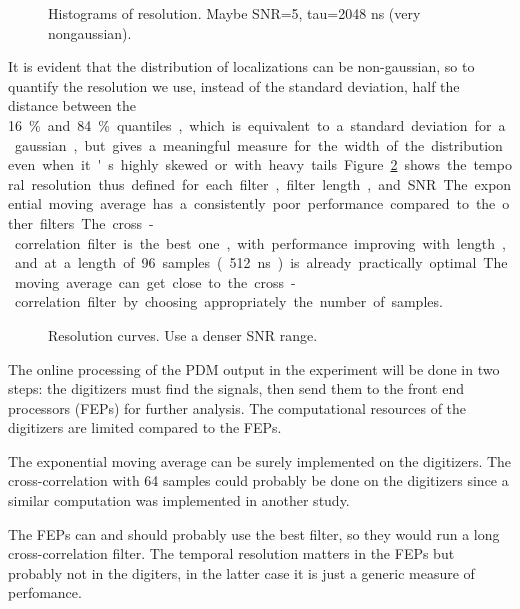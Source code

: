 \begin{figure}
    Histograms of resolution. Maybe SNR=5, tau=2048 ns (very nongaussian).
    \caption{}
    \label{fig:lochist}
\end{figure}

It is evident that the distribution of localizations can be non-gaussian, so to
quantify the resolution we use, instead of the standard deviation, half the
distance between the \SI{16}\% and \SI{84}\% quantiles, which is equivalent to
a standard deviation for a gaussian, but gives a meaningful measure for the
width of the distribution even when it's highly skewed or with heavy tails.

Figure~\ref{fig:rescurve} shows the temporal resolution thus defined for each
filter, filter length, and SNR. The exponential moving average has a
consistently poor performance compared to the other filters. The
cross-correlation filter is the best one, with performance improving with
length, and at a length of 96 samples (\SI{512}{ns}) is already practically
optimal. The moving average can get close to the cross-correlation filter by
choosing appropriately the number of samples.

\begin{figure}
    Resolution curves. Use a denser SNR range.
    \caption{}
    \label{fig:rescurve}
\end{figure}

The online processing of the PDM output in the experiment will be done in two
steps: the digitizers must find the signals, then send them to the front end
processors (FEPs) for further analysis. The computational resources of the
digitizers are limited compared to the FEPs.

The exponential moving average can be surely implemented on the digitizers. The
cross-correlation with 64 samples could probably be done on the digitizers
since a similar computation was implemented in another study.

The FEPs can and should probably use the best filter, so they would run a long
cross-correlation filter. The temporal resolution matters in the FEPs but
probably not in the digiters, in the latter case it is just a generic measure
of perfomance.

